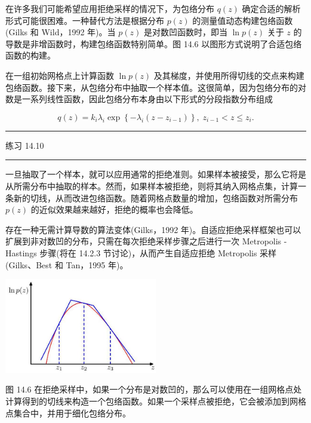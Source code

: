 \documentclass[10pt]{report}
\newcommand{\HRule}{\begin{center}\rule{0.9\linewidth}{0.2mm}\end{center}}
\begin{document}
在许多我们可能希望应用拒绝采样的情况下，为包络分布 \(q\left( z\right)\) 确定合适的解析形式可能很困难。一种替代方法是根据分布 \(p\left( z\right)\) 的测量值动态构建包络函数(Gilks 和 Wild，1992 年)。当 \(p\left( z\right)\) 是对数凹函数时，即当 \(\ln p\left( z\right)\) 关于 \(z\) 的导数是非增函数时，构建包络函数特别简单。图 14.6 以图形方式说明了合适包络函数的构建。

在一组初始网格点上计算函数 \(\ln p\left( z\right)\) 及其梯度，并使用所得切线的交点来构建包络函数。接下来，从包络分布中抽取一个样本值。这很简单，因为包络分布的对数是一系列线性函数，因此包络分布本身由以下形式的分段指数分布组成

\[
q\left( z\right)  = {k}_{i}{\lambda }_{i}\exp \left\{  {-{\lambda }_{i}\left( {z - {z}_{i - 1}}\right) }\right\}  ,\;{z}_{i - 1} < z \leq  {z}_{i}. \tag{14.17}
\]

\HRule

练习 14.10

\HRule

一旦抽取了一个样本，就可以应用通常的拒绝准则。如果样本被接受，那么它将是从所需分布中抽取的样本。然而，如果样本被拒绝，则将其纳入网格点集，计算一条新的切线，从而改进包络函数。随着网格点数量的增加，包络函数对所需分布 \(p\left( z\right)\) 的近似效果越来越好，拒绝的概率也会降低。

存在一种无需计算导数的算法变体(Gilks，1992 年)。自适应拒绝采样框架也可以扩展到非对数凹的分布，只需在每次拒绝采样步骤之后进行一次 Metropolis - Hastings 步骤(将在 14.2.3 节讨论)，从而产生自适应拒绝 Metropolis 采样(Gilks、Best 和 Tan，1995 年)。

\begin{center}
\includegraphics[max width=0.5\textwidth]{images/0194e279-9b28-703a-88f4-c3ac21e2010d_455_916_344_635_395_0.jpg}
\end{center}
\hspace*{3em} 

图 14.6 在拒绝采样中，如果一个分布是对数凹的，那么可以使用在一组网格点处计算得到的切线来构造一个包络函数。如果一个采样点被拒绝，它会被添加到网格点集合中，并用于细化包络分布。
\end{document}
